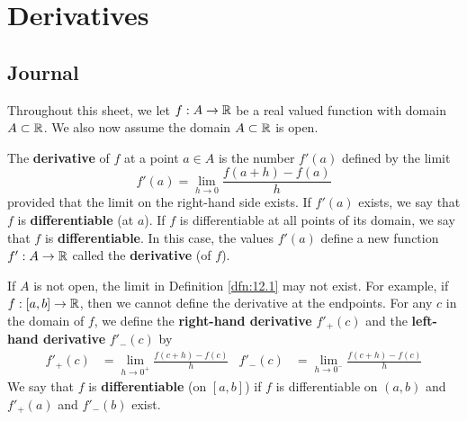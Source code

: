 \documentclass[../main.tex]{subfiles}
\begin{document}
\chapter{Derivatives}\label{sct:12}
\section{Journal}
Throughout this sheet, we let $f:A\to\mathbb{R}$ be a real valued function with domain $A\subset\mathbb{R}$. We also now assume the domain $A\subset\mathbb{R}$ is open.
\begin{definition}\label{dfn:12.1}
    The \textbf{derivative} of $f$ at a point $a\in A$ is the number $f'(a)$ defined by the limit
    \begin{equation*}
        f'(a) = \lim_{h\to 0}\frac{f(a+h)-f(a)}{h}
    \end{equation*}
    provided that the limit on the right-hand side exists. If $f'(a)$ exists, we say that $f$ is \textbf{differentiable} (at $a$). If $f$ is differentiable at all points of its domain, we say that $f$ is \textbf{differentiable}. In this case, the values $f'(a)$ define a new function $f':A\to\mathbb{R}$ called the \textbf{derivative} (of $f$).
\end{definition}

\begin{remark}\label{rmk:12.2}
    If $A$ is not open, the limit in Definition \ref{dfn:12.1} may not exist. For example, if $f:[a,b]\to\mathbb{R}$, then we cannot define the derivative at the endpoints. For any $c$ in the domain of $f$, we define the \textbf{right-hand derivative} $f'_+(c)$ and the \textbf{left-hand derivative} $f'_-(c)$ by
    \begin{align*}
        f'_+(c) &= \lim_{h\to 0^+}\frac{f(c+h)-f(c)}{h}&
        f'_-(c) &= \lim_{h\to 0^-}\frac{f(c+h)-f(c)}{h}
    \end{align*}
    We say that $f$ is \textbf{differentiable} (on $[a,b]$) if $f$ is differentiable on $(a,b)$ and $f'_+(a)$ and $f'_-(b)$ exist.
\end{remark}
\end{document}
